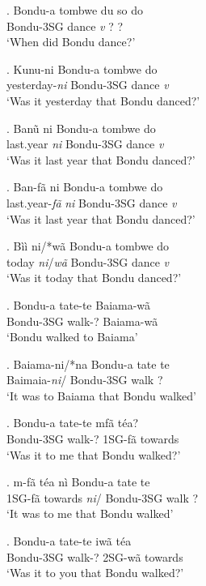 \documentclass{assets/fieldnotes}
\begin{document}
\exg. Bondu-a tombwe du so do\\
Bondu-3SG dance \textit{v} ? ?\\
`When did Bondu dance?'

\exg. Kunu-ni Bondu-a tombwe do\\
yesterday-\textit{ni} Bondu-3SG dance \textit{v}\\
`Was it yesterday that Bondu danced?'

\exg. Banũ ni Bondu-a tombwe do\\
last.year \textit{ni} Bondu-3SG dance \textit{v}\\
`Was it last year that Bondu danced?'

\exg. Ban-fã ni Bondu-a tombwe do\\
last.year-\textit{fã} \textit{ni} Bondu-3SG dance \textit{v}\\
`Was it last year that Bondu danced?'

\exg. Bìì ni/*wã Bondu-a tombwe do\\
today \textit{ni}/\textit{wã} Bondu-3SG dance \textit{v}\\
`Was it today that Bondu danced?'

\exg. Bondu-a tate-te Baiama-wã\\
Bondu-3SG walk-? Baiama-wã\\
`Bondu walked to Baiama'

\exg. Baiama-ni/*na Bondu-a tate te\\
Baimaia-\textit{ni}/ Bondu-3SG walk ?\\
`It was to Baiama that Bondu walked'

\exg. Bondu-a tate-te mfã téa?\\
Bondu-3SG walk-? 1SG-fã towards\\
`Was it to me that Bondu walked?'

\exg. m-fã téa nì Bondu-a tate te\\
1SG-fã towards \textit{ni}/ Bondu-3SG walk ?\\
`It was to me that Bondu walked'

\exg. Bondu-a tate-te iwã téa\\
Bondu-3SG walk-? 2SG-wã towards\\
`Was it to you that Bondu walked?'
\end{document}
